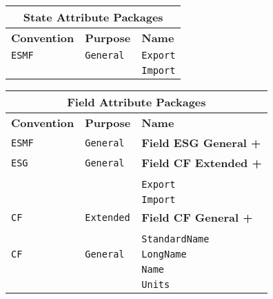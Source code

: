 \vspace{18pt}

\begin{tabular}{|p{4cm}|p{4cm}|p{6cm}|}
\hline
\multicolumn{3}{|c|}{{\bf \large State Attribute Packages}} \\
\hline\hline
{\bf Convention} & {\bf Purpose} & {\bf Name} \\
\hline\hline
{\tt ESMF} & {\tt General} & {\tt Export}  \\
 & & {\tt Import} \\ 
\hline
\end{tabular}
\label{StateAttributePackages}

\vspace{18pt}

\begin{tabular}{|p{4cm}|p{4cm}|p{6cm}|}
\hline
\multicolumn{3}{|c|}{{\bf \large Field Attribute Packages}} \\
\hline\hline
{\bf Convention} & {\bf Purpose} & {\bf Name} \\
\hline\hline
{\tt ESMF} & {\tt General} & {\bf Field ESG General +} \\
{\tt ESG} & {\tt General} & {\bf Field CF Extended +} \\
& & \\
& & {\tt Export}  \\
 & & {\tt Import} \\ 
\hline
{\tt CF} & {\tt Extended} & {\bf Field CF General +} \\
& & \\
& & {\tt StandardName}\\ 
\hline
{\tt CF} & {\tt General} & {\tt LongName}\\
     & & {\tt Name} \\
     & & {\tt Units}  \\
\hline
\end{tabular}
\label{FieldAttributePackages}

